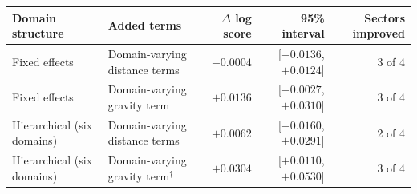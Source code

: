 \begin{tabular}{llrrr}
\toprule
Domain structure & Added terms & $\Delta$ log score & 95\% interval & Sectors improved \\
\midrule
Fixed effects & Domain-varying distance terms & $-0.0004$ & [$-0.0136$, $+0.0124$] & 3 of 4 \\
Fixed effects & Domain-varying gravity term & $+0.0136$ & [$-0.0027$, $+0.0310$] & 3 of 4 \\
Hierarchical (six domains) & Domain-varying distance terms & $+0.0062$ & [$-0.0160$, $+0.0291$] & 2 of 4 \\
Hierarchical (six domains) & Domain-varying gravity term$^{\dagger}$ & $+0.0304$ & [$+0.0110$, $+0.0530$] & 3 of 4 \\
\bottomrule
\end{tabular}
